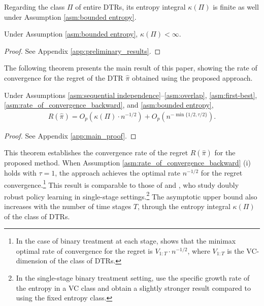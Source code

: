 Regarding the class $\Pi$ of entire DTRs, its entropy integral $\kappa(\Pi)$ is finite as well under Assumption \ref{asm:bounded entropy}. 

\medskip

\begin{lemma}\label{lem:entropy_integral_bound}
Under Assumption \ref{asm:bounded entropy}, $\kappa(\Pi) < \infty$.
\end{lemma}

\begin{proof}
See Appendix \ref{app:preliminary_results}.
\end{proof}

\medskip


The following theorem presents the main result of this paper, showing the rate of convergence for the regret of the DTR $\hat{\pi}$ obtained using the proposed approach.

\medskip

\begin{theorem}\label{thm:main_theorem_backward}
Under Assumptions \ref{asm:sequential independence}--\ref{asm:overlap}, \ref{asm:first-best}, \ref{asm:rate_of_convergence_backward}, and \ref{asm:bounded entropy},
\begin{align*}
    R(\hat{\pi}) = O_{p}\left(\kappa(\Pi) \cdot n^{-1/2}\right) + O_{p} (n^{-\min\{1/2,\tau/2\}}). 
\end{align*}
\end{theorem}

\begin{proof}
See Appendix \ref{app:main_proof}.
\end{proof}

\medskip

This theorem establishes the convergence rate of the regret $R(\hat{\pi})$ for the proposed method. When Assumption \ref{asm:rate_of_convergence_backward} (i) holds with $\tau = 1$, the approach achieves the optimal rate $n^{-1/2}$ for the regret convergence.\footnote{In the case of binary treatment at each stage, \cite{Sakaguchi_2021} shows that the minimax optimal rate of convergence for the regret is $V_{1:T}\cdot n^{-1/2}$, where $V_{1:T}$ is the VC-dimension of the class of DTRs.} This result is comparable to those of \cite{Athey_Wager_2020} and \cite{zhou2022offline}, who study doubly robust policy learning in single-stage settings.\footnote{In the single-stage binary treatment setting, \cite{Athey_Wager_2020} use the specific growth rate of the entropy in a VC class and obtain a slightly stronger result compared to using the fixed entropy class.}
The asymptotic upper bound also increases with the number of time stages $T$, through the entropy integral $\kappa(\Pi)$ of the class of DTRs.

